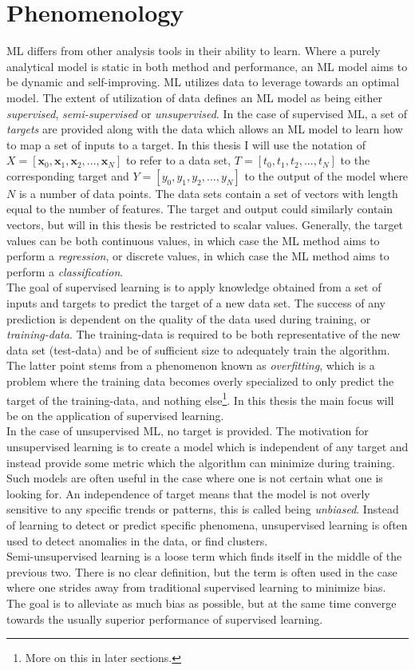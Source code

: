 \section{Phenomenology}\label{sec:MLPhen}
\ac{ML} differs from other analysis tools in their ability to learn. 
Where a purely analytical model is static in both method 
and performance, an \ac{ML} model aims to be dynamic and self-improving. 
\ac{ML} utilizes data to leverage towards an optimal
model. The extent of utilization of data defines an \ac{ML} model as being
either \emph{supervised}, \emph{semi-supervised} or \emph{unsupervised}. In the case 
of supervised \ac{ML}, a set of \emph{targets} are provided along with the
data which allows an \ac{ML} model to learn how to map a set of inputs to a target. In this 
thesis I will use the notation of $X = [\textbf{x}_0,\textbf{x}_1,\textbf{x}_2,...,\textbf{x}_N]$ to refer to 
a data set, $T = [t_0,t_1,t_2,...,t_N]$ to the corresponding target and $Y=[y_0,y_1,y_2,...,y_N]$ 
to the output of the model where $N$ is a number of data points. The data sets contain a set of vectors with length equal to the number 
of features. The target and output could similarly contain vectors, but will in this thesis be restricted 
to scalar values. Generally, the target values can be both continuous values, in which case the \ac{ML} 
method aims to perform a \emph{regression}, or discrete values, in which case the \ac{ML} method aims 
to perform a \emph{classification}. 
\\
The goal of supervised learning is to apply knowledge obtained from 
a set of inputs and targets to predict the target of a new data set. 
The success of any prediction is dependent on the quality of the 
data used during training, or \emph{training-data}. The training-data is required to 
be both representative of the new data set (test-data) and be of sufficient size to 
adequately train the algorithm. The latter point stems from a phenomenon known as \emph{overfitting},
which is a problem where the training data becomes overly specialized to only predict 
the target of the training-data, and nothing else\footnote{More on this in later sections.}.
In this thesis the main focus will be on the application of supervised learning.
\\
In the case of unsupervised \ac{ML}, no target is provided. The motivation for unsupervised
learning is to create a model which is independent of any target and instead provide some metric 
which the algorithm can minimize during training. Such models are often useful in the case where 
one is not certain what one is looking for. An independence of target means that the model 
is not overly sensitive to any specific trends or patterns, this is called
being \emph{unbiased}. Instead of learning to detect or predict specific phenomena,
unsupervised learning is often used to detect anomalies in the data, or find clusters.
\\
Semi-unsupervised learning is a loose term which finds itself in the middle of the previous two. 
There is no clear definition, but the term is often used in the case where one strides away from 
traditional supervised learning to minimize bias. The goal is to alleviate as much bias as possible, 
but at the same time converge towards the usually superior performance of supervised learning.  